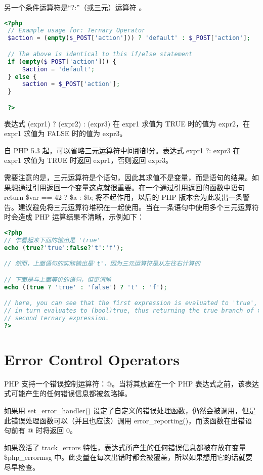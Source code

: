另一个条件运算符是“?:”（或三元）运算符 。


\begin{lstlisting}[language=PHP]
<?php
 // Example usage for: Ternary Operator
 $action = (empty($_POST['action'])) ? 'default' : $_POST['action'];

 // The above is identical to this if/else statement
 if (empty($_POST['action'])) {
     $action = 'default';
 } else {
     $action = $_POST['action'];
 }

 ?>
\end{lstlisting}

表达式 (expr1) ? (expr2) : (expr3) 在 expr1 求值为 TRUE 时的值为 expr2，在 expr1 求值为 FALSE 时的值为 expr3。

自 PHP 5.3 起，可以省略三元运算符中间那部分。表达式 expr1 ?: expr3 在 expr1 求值为 TRUE 时返回 expr1，否则返回 expr3。

需要注意的是，三元运算符是个语句，因此其求值不是变量，而是语句的结果。如果想通过引用返回一个变量这点就很重要。在一个通过引用返回的函数中语句 return \$var == 42 ? \$a : \$b; 将不起作用，以后的 PHP 版本会为此发出一条警告。建议避免将三元运算符堆积在一起使用。当在一条语句中使用多个三元运算符时会造成 PHP 运算结果不清晰，示例如下：


\begin{lstlisting}[language=PHP]
<?php
// 乍看起来下面的输出是 'true'
echo (true?'true':false?'t':'f');

// 然而，上面语句的实际输出是't'，因为三元运算符是从左往右计算的

// 下面是与上面等价的语句，但更清晰
echo ((true ? 'true' : 'false') ? 't' : 'f');

// here, you can see that the first expression is evaluated to 'true', which
// in turn evaluates to (bool)true, thus returning the true branch of the
// second ternary expression.
?>
\end{lstlisting}


\section{Error Control Operators}

PHP 支持一个错误控制运算符：@。当将其放置在一个 PHP 表达式之前，该表达式可能产生的任何错误信息都被忽略掉。

如果用 set\_error\_handler() 设定了自定义的错误处理函数，仍然会被调用，但是此错误处理函数可以（并且也应该）调用 error\_reporting()，而该函数在出错语句前有 @ 时将返回 0。

如果激活了 track\_errors 特性，表达式所产生的任何错误信息都被存放在变量 \$php\_errormsg 中。此变量在每次出错时都会被覆盖，所以如果想用它的话就要尽早检查。

